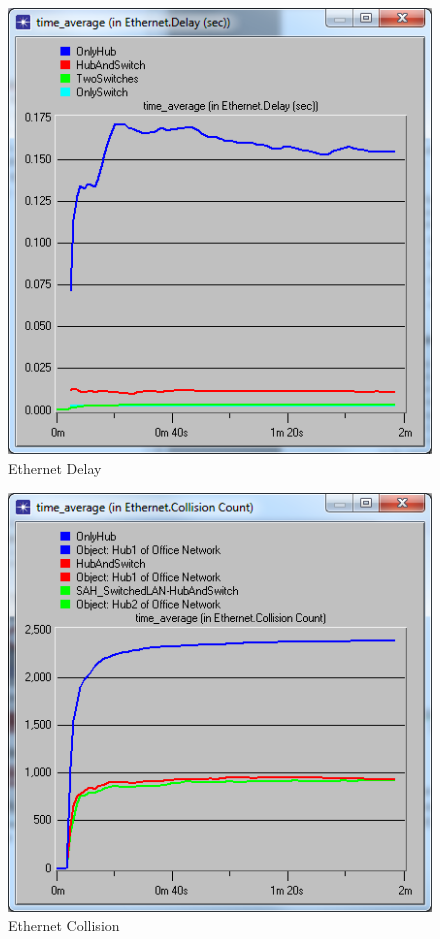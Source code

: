 \documentclass[letter,12pt]{article}
\begin{document}
	\begin{figure}[h!]
		\centering
			\includegraphics[scale=0.6]{Ethernet_Delay.png}
		\caption{Ethernet Delay}
		\label{Ethernet_Delay}
	\end{figure}
	
	\begin{figure}[h!]
		\centering
		\includegraphics[scale=0.6]{Ethernet_Collision.png}
		\caption{Ethernet Collision}
		\label{Ethernet_Collisions}
	\end{figure}
	
\end{document}
